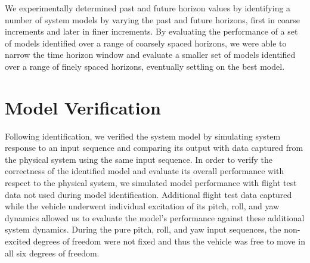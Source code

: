 We experimentally determined past and future horizon values by identifying a number of system models by varying the past and future horizons, first in coarse increments and later in finer increments. By evaluating the performance of a set of models identified over a range of coarsely spaced horizons, we were able to narrow the time horizon window and evaluate a smaller set of models identified  over a range of finely spaced horizons, eventually settling on the best model. 


\section{Model Verification}
Following identification, we verified the system model by simulating system response to an input sequence and comparing its output with data captured from the physical system using the same input sequence. In order to verify the correctness of the identified model and evaluate its overall performance with respect to the physical system, we simulated model performance with flight test data not used during model identification. Additional flight test data captured while the vehicle underwent individual excitation of its pitch, roll, and yaw dynamics allowed us to evaluate the model's performance against these additional system dynamics. During the pure pitch, roll, and yaw input sequences, the non-excited degrees of freedom were not fixed and thus the vehicle was free to move in all six degrees of freedom.























